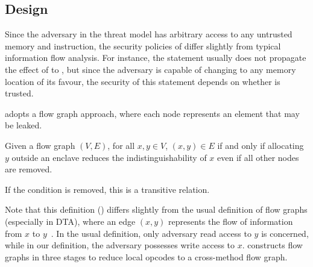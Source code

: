\subsection{Design}\label{subsec:design}
Since the adversary in the threat model
has arbitrary access to any untrusted memory and instruction,
the security policies of \pname{} differ slightly from typical information flow analysis.
For instance, the statement  usually
does not propagate the effect of  to ,
but since the adversary is capable of changing  to any memory location of its favour,
the security of this statement depends on whether  is trusted.

\pname{} adopts a flow graph approach,
where each node represents an element that may be leaked.

\begin{defin}
	Given a flow graph $(V, E)$, for all $x, y \in V$,
	$(x, y) \in E$ if and only if
	allocating $y$ outside an enclave reduces the indistinguishability of $x$
	even if all other nodes are removed.

	If the  condition is removed, this is a transitive relation.
\end{defin}

Note that this definition () differs slightly from
the usual definition of flow graphs (especially in \ac{DTA}),
where an edge $(x, y)$ represents the flow of information from $x$ to $y$~\cite{YinHeng2007Pcsi}.
In the usual definition, only adversary read access to $y$ is concerned,
while in our definition, the adversary possesses write access to $x$.
\pname{} constructs flow graphs in three stages
to reduce local opcodes to a cross-method flow graph.

